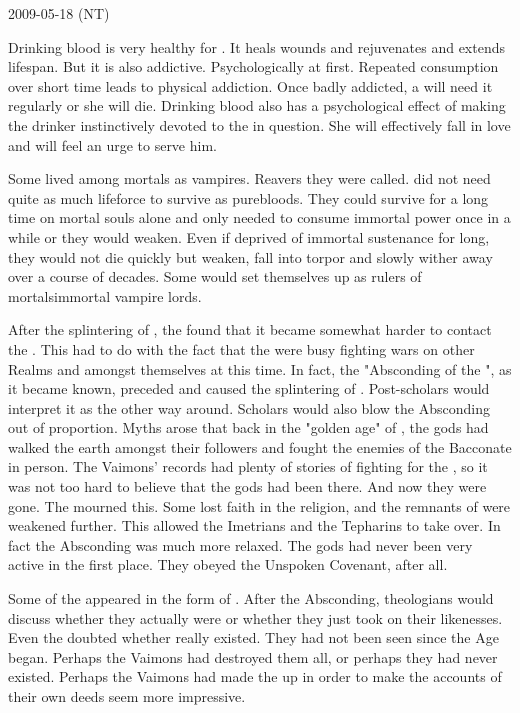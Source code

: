 2009-05-18 (NT)

Drinking \resphan blood is very healthy for \humans.
It heals wounds and rejuvenates and extends lifespan.
But it is also addictive.
Psychologically at first.
Repeated consumption over short time leads to physical addiction.
Once badly addicted, a \human will need it regularly or she will die.
Drinking \resphan blood also has a psychological effect of making the drinker instinctively devoted to the \resphan in question.
She will effectively fall in love and will feel an urge to serve him.

Some \ashenblood \resphain lived among mortals as vampires.
Reavers they were called. 
\Bezedeth did not need quite as much lifeforce to survive as purebloods. 
They could survive for a long time on mortal souls alone and only needed to consume immortal power once in a while or they would weaken.
Even if deprived of immortal sustenance for long, they would not die quickly but weaken, fall into torpor and slowly wither away over a course of decades.
Some would set themselves up as rulers of mortals\dash{}immortal vampire lords.

After the splintering of \Ortaica, the \rethyaxes found that it became somewhat harder to contact the \taorthae.
This had to do with the fact that the \taorthae were busy fighting wars on other Realms and amongst themselves at this time.
In fact, the "Absconding of the \taorthae", as it became known, preceded and caused the splintering of \Ortaica.
Post-\Ortaican \rethyactic scholars would interpret it as the other way around.
Scholars would also blow the Absconding out of proportion.
Myths arose that back in the "golden age" of \Ortaica, the gods had walked the earth amongst their followers and fought the enemies of the Bacconate in person.
The Vaimons' records had plenty of stories of \daemons fighting for the \Ortaicans, so it was not too hard to believe that the gods had been there. 
And now they were gone. 
The \rethyaxes mourned this.
Some lost faith in the \rethyactic religion, and the remnants of \Ortaica were weakened further.
This allowed the Imetrians and the \Iquinian Tepharins to take over.
In fact the Absconding was much more relaxed. 
The gods had never been very active in the first place.
They obeyed the Unspoken Covenant, after all.

Some of the \taorthae appeared in the form of \dragons. 
After the Absconding, \rethyactic theologians would discuss whether they actually were \dragons or whether they just took on their likenesses. 
Even the \rethyaxes doubted whether \dragons really existed.
They had not been seen since the \human Age began.
Perhaps the Vaimons had destroyed them all, or perhaps they had never existed.
Perhaps the Vaimons had made the \dragons up in order to make the accounts of their own deeds seem more impressive.

